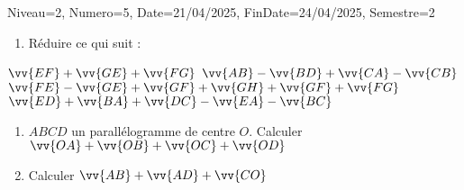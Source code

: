 \documentclass[a4paper,12pt]{article}
\begin{document}
\begin{Maquette}[DM]{Niveau=2, Numero=5, Date=21/04/2025, FinDate=24/04/2025, Semestre=2}
\begin{exercice}
\begin{enumerate}
\item Réduire ce qui suit :
\end{enumerate}
\begin{tasks}
\task $\vv{EF}+\vv{GE}+\vv{FG}$
\task $\vv{AB}-\vv{BD}+\vv{CA}-\vv{CB}$
\task $\vv{FE}-\vv{GE}+\vv{GF}+\vv{GH}+\vv{GF}+\vv{FG}$
\task $\vv{ED}+\vv{BA}+\vv{DC}-\vv{EA}-\vv{BC}$
\end{tasks}
\begin{enumerate}[start=2]
\item $ABCD$ un parallélogramme de centre $O$.
 Calculer $\vv{OA}+\vv{OB}+\vv{OC}+\vv{OD}$
 \item Calculer $\vv{AB}+\vv{AD}+\vv{CO}$
\end{enumerate}

\end{exercice}


\end{Maquette}
\end{document}
